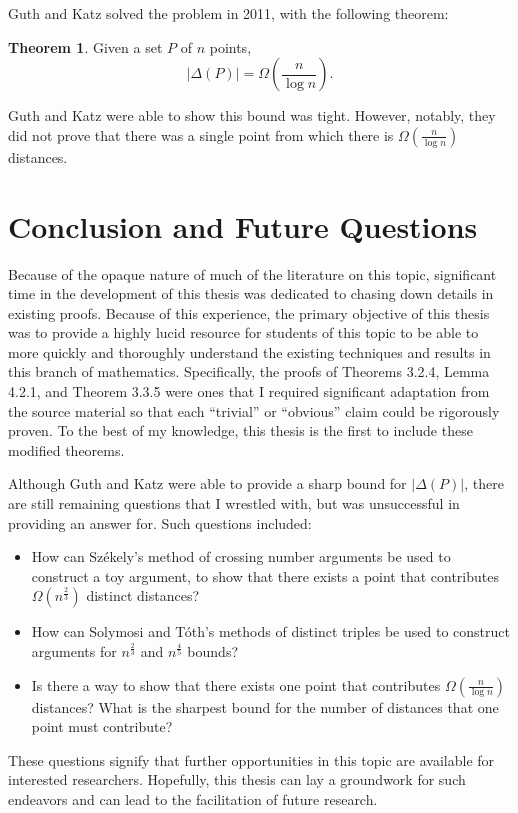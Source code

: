 \documentclass{scrippsthesisclass}
\theoremstyle{definition}
\newtheorem{theorem}{Theorem}[section]
\begin{document}
Guth and Katz solved the problem in 2011, with the following theorem:
\begin{theorem}\cite{GuthKatz}
    Given a set $P$ of $n$ points, 
    \[
    |\Delta(P)| = \Omega \left(\frac{n}{\log n}\right).
    \]
\end{theorem}
Guth and Katz were able to show this bound was tight.
However, notably, they did not prove that there was a single point from which there is $\Omega\left(\frac{n}{\log n}\right)$ distances. 
    
\newpage


\chapter{Conclusion and Future Questions}
    Because of the opaque nature of much of the literature on this topic, significant time 
     in the development of this thesis was dedicated to chasing down details in existing proofs.
     Because of this experience, the primary objective of this thesis was to provide a highly lucid resource for students of this topic to be able to more quickly and thoroughly understand the existing techniques and results in this branch of mathematics. 
    Specifically, the proofs of Theorems 3.2.4, Lemma 4.2.1, and Theorem 3.3.5 were ones that I required significant adaptation from the source material so that each ``trivial'' or ``obvious'' claim could be rigorously proven.
    To the best of my knowledge, this thesis is the first to include these modified theorems.  

    Although Guth and Katz were able to provide a sharp bound for $|\Delta(P)|$, there are still remaining questions that I wrestled with, but was unsuccessful in providing an answer for.
    Such questions included:
    \begin{itemize}
        \item How can Sz\'{e}kely's method of crossing number arguments be used to construct a toy argument, to show that there exists a point that contributes $\Omega\left(n^{\frac{2}{3}}\right)$ distinct distances?
        \item How can Solymosi and T\'{o}th's methods of distinct triples be used to construct arguments for $n^{\frac{2}{3}}$ and $n^{\frac{4}{5}}$ bounds?
        \item Is there a way to show that there exists one point that contributes $\Omega\left(\frac{n}{\log n}\right)$ distances? What is the sharpest bound for the number of distances that one point must contribute? 
    \end{itemize}
    These questions signify that further  opportunities in this topic are available for interested researchers. 
    Hopefully, this thesis can lay a groundwork for such endeavors and can lead to the facilitation of future research. 
    
\end{document}
